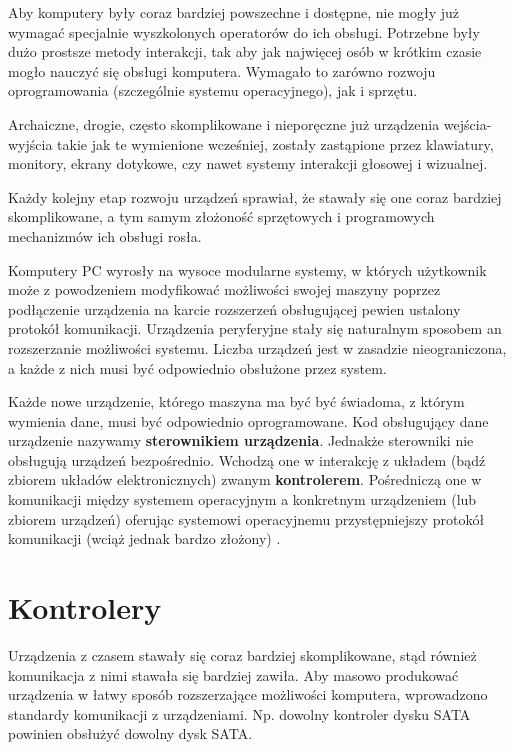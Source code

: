 \documentclass[shortabstract,inz]{iithesis}
\begin{document}
Aby komputery były coraz bardziej powszechne i dostępne, nie mogły już wymagać
specjalnie wyszkolonych operatorów do ich obsługi. Potrzebne były dużo prostsze
metody interakcji, tak aby jak najwięcej osób w krótkim czasie mogło nauczyć się
obsługi komputera.
Wymagało to zarówno rozwoju oprogramowania (szczególnie systemu operacyjnego), 
jak i sprzętu.

Archaiczne, drogie, często skomplikowane i nieporęczne już urządzenia wejścia-wyjścia 
takie jak te wymienione wcześniej, zostały zastąpione przez
klawiatury, monitory, ekrany dotykowe, czy nawet systemy interakcji głosowej i wizualnej.

Każdy kolejny etap rozwoju urządzeń sprawiał, że stawały się one coraz bardziej skomplikowane,
a tym samym złożoność sprzętowych i programowych mechanizmów ich obsługi rosła.

Komputery PC \cite{pleonazm} wyrosły na wysoce modularne systemy, w których użytkownik może
z powodzeniem modyfikować możliwości swojej maszyny poprzez podłączenie
urządzenia na karcie rozszerzeń obsługującej pewien ustalony protokół komunikacji.
Urządzenia peryferyjne stały się naturalnym sposobem an rozszerzanie
możliwości systemu. Liczba urządzeń jest w zasadzie
nieograniczona, a każde z nich musi być odpowiednio obsłużone przez
system.

Każde nowe urządzenie, którego maszyna ma być być świadoma, z którym
wymienia dane, musi być odpowiednio oprogramowane. Kod obsługujący
dane urządzenie nazywamy \textbf{sterownikiem urządzenia}. Jednakże
sterowniki nie obsługują urządzeń bezpośrednio.
Wchodzą one w interakcję z układem (bądź zbiorem układów elektronicznych) zwanym
\textbf{kontrolerem}. Pośredniczą one w komunikacji między systemem
operacyjnym a konkretnym urządzeniem (lub zbiorem urządzeń) oferując systemowi operacyjnemu
przystępniejszy protokół komunikacji (wciąż jednak bardzo złożony) \cite{book:tanenbaum_hardware}.


\section{Kontrolery} %
\label{sec:kontrolery}

Urządzenia z czasem stawały się coraz bardziej skomplikowane, stąd
również komunikacja z nimi stawała się bardziej zawiła. 
Aby masowo produkować urządzenia w łatwy sposób rozszerzające możliwości
komputera, wprowadzono standardy komunikacji z urządzeniami.
Np. dowolny kontroler dysku SATA \cite{sata} powinien obsłużyć dowolny dysk SATA.
\end{document}
